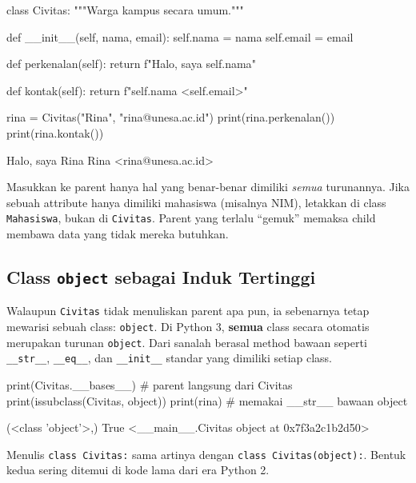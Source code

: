 \begin{kode}
class Civitas:
    """Warga kampus secara umum."""

    def __init__(self, nama, email):
        self.nama = nama
        self.email = email

    def perkenalan(self):
        return f"Halo, saya {self.nama}"

    def kontak(self):
        return f"{self.nama} <{self.email}>"

rina = Civitas("Rina", "rina@unesa.ac.id")
print(rina.perkenalan())
print(rina.kontak())
\end{kode}

\begin{keluaran}
Halo, saya Rina
Rina <rina@unesa.ac.id>
\end{keluaran}

\begin{tips}
Masukkan ke parent hanya hal yang benar-benar dimiliki \emph{semua} turunannya. Jika sebuah attribute hanya dimiliki mahasiswa (misalnya NIM), letakkan di class \texttt{Mahasiswa}, bukan di \texttt{Civitas}. Parent yang terlalu ``gemuk'' memaksa child membawa data yang tidak mereka butuhkan.
\end{tips}

\subsection{Class \texttt{object} sebagai Induk Tertinggi}

Walaupun \texttt{Civitas} tidak menuliskan parent apa pun, ia sebenarnya tetap mewarisi sebuah class: \texttt{object}. Di Python 3, \textbf{semua} class secara otomatis merupakan turunan \texttt{object}. Dari sanalah berasal method bawaan seperti \texttt{\_\_str\_\_}, \texttt{\_\_eq\_\_}, dan \texttt{\_\_init\_\_} standar yang dimiliki setiap class.

\begin{kode}
print(Civitas.__bases__)              # parent langsung dari Civitas
print(issubclass(Civitas, object))
print(rina)                            # memakai __str__ bawaan object
\end{kode}

\begin{keluaran}
(<class 'object'>,)
True
<__main__.Civitas object at 0x7f3a2c1b2d50>
\end{keluaran}

Menulis \texttt{class Civitas:} sama artinya dengan \texttt{class Civitas(object):}. Bentuk kedua sering ditemui di kode lama dari era Python 2.


